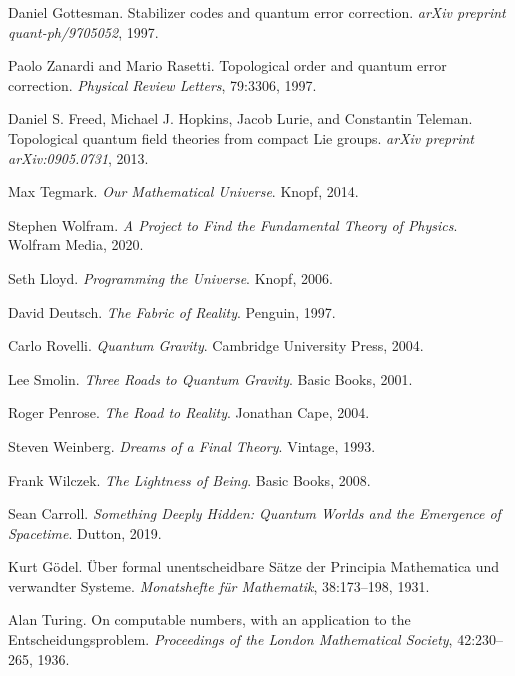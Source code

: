 \documentclass[11pt,a4paper]{article}
\begin{document}
\begin{thebibliography}{99}
Daniel Gottesman.
\newblock Stabilizer codes and quantum error correction.
\newblock \emph{arXiv preprint quant-ph/9705052}, 1997.

Paolo Zanardi and Mario Rasetti.
\newblock Topological order and quantum error correction.
\newblock \emph{Physical Review Letters}, 79:3306, 1997.

Daniel S. Freed, Michael J. Hopkins, Jacob Lurie, and Constantin Teleman.
\newblock Topological quantum field theories from compact {L}ie groups.
\newblock \emph{arXiv preprint arXiv:0905.0731}, 2013.

Max Tegmark.
\newblock \emph{Our Mathematical Universe}.
\newblock Knopf, 2014.

Stephen Wolfram.
\newblock \emph{A Project to Find the Fundamental Theory of Physics}.
\newblock Wolfram Media, 2020.

Seth Lloyd.
\newblock \emph{Programming the Universe}.
\newblock Knopf, 2006.

David Deutsch.
\newblock \emph{The Fabric of Reality}.
\newblock Penguin, 1997.

Carlo Rovelli.
\newblock \emph{Quantum Gravity}.
\newblock Cambridge University Press, 2004.

Lee Smolin.
\newblock \emph{Three Roads to Quantum Gravity}.
\newblock Basic Books, 2001.

Roger Penrose.
\newblock \emph{The Road to Reality}.
\newblock Jonathan Cape, 2004.

Steven Weinberg.
\newblock \emph{Dreams of a Final Theory}.
\newblock Vintage, 1993.

Frank Wilczek.
\newblock \emph{The Lightness of Being}.
\newblock Basic Books, 2008.

Sean Carroll.
\newblock \emph{Something Deeply Hidden: Quantum Worlds and the Emergence of Spacetime}.
\newblock Dutton, 2019.

Kurt Gödel.
\newblock Über formal unentscheidbare {S}ätze der {P}rincipia {M}athematica und verwandter {S}ysteme.
\newblock \emph{Monatshefte für Mathematik}, 38:173--198, 1931.

Alan Turing.
\newblock On computable numbers, with an application to the {E}ntscheidungsproblem.
\newblock \emph{Proceedings of the London Mathematical Society}, 42:230--265, 1936.


\end{thebibliography}
\end{document}
